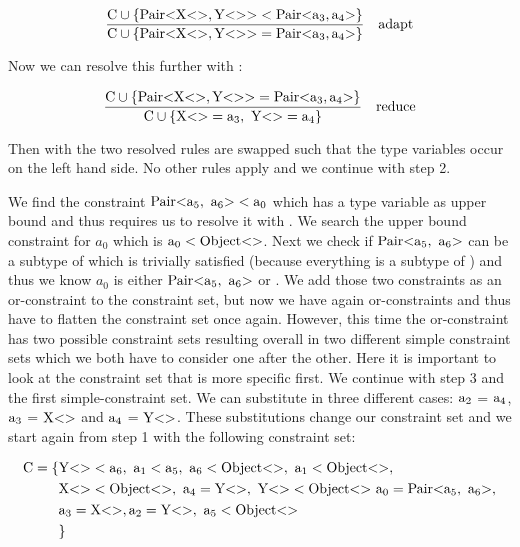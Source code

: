 \begin{align*}
    \frac{\text{C} \cup \{ \text{Pair} \text{<} \text{X} \text{<}  \text{>}, \text{Y} \text{<}  \text{>} \text{>} < \text{Pair} \text{<} \text{a}_{3}, \text{a}_{4} \text{>} \} }{\text{C} \cup \{ \text{Pair} \text{<} \text{X} \text{<}  \text{>}, \text{Y} \text{<}  \text{>} \text{>} = \text{Pair} \text{<} \text{a}_{3}, \text{a}_{4} \text{>} \} } \quad \text{adapt}
\end{align*}

Now we can resolve this further with :

\begin{align*}
    \frac{\cand \{ \nvtt{Pair}{\nvtt{X}{}, \nvtt{Y}{}} = \nvtt{Pair}{\fa{3}, \fa{4}} \} }{\cand \{ \nvtt{X}{} = \fa{3}, \ \nvtt{Y}{} = \fa{4} \} } \quad \text{reduce}
\end{align*}

Then with  the two resolved rules are swapped such that the type variables  occur on the left hand side.
No other rules apply and we continue with step 2.

We find the constraint $\text{Pair} \text{<} \text{a}_{5}, \ \text{a}_{6} \text{>} < \text{a}_{0}$ which has a type variable as upper bound and thus requires us to resolve it with . We search the upper bound constraint for $a_0$ which is $\text{a}_{0} < \text{Object} \text{<}  \text{>}$.
Next we check if $\nvtt{Pair}{\fa{5}, \ \fa{6}}$ can be a subtype of  which is trivially satisfied (because everything is a subtype of ) and thus we know $a_0$ is either $\nvtt{Pair}{\fa{5}, \ \fa{6}}$ or . We add those two constraints as an or-constraint
to the constraint set, but now we have again or-constraints and thus have to flatten the constraint set once again. However, this time the or-constraint has two possible constraint sets resulting overall in two different simple constraint sets which we both have to consider one after the other.
Here it is important to look at the constraint set that is more specific first. We continue with step 3 and the first simple-constraint set. We can substitute in three different cases: $\text{a}_{2}$ = $\text{a}_{4}$, $\text{a}_{3}$ = $\text{X} \text{<}  \text{>}$ and $\text{a}_{4}$ =  $\text{Y} \text{<}  \text{>}$.
These substitutions change our constraint set and we start again from step 1 with the following constraint set:

\begin{align*}
    \text{C} = \{& \nvtt{Y}{} < \fa{6}, \ \fa{1} < \fa{5}, \ \fa{6} < \nvtt{Object}{}, \ \fa{1} < \nvtt{Object}{}, \\
    &\nvtt{X}{} < \nvtt{Object}{}, \ \fa{4} = \nvtt{Y}{}, \ \nvtt{Y}{} < \nvtt{Object}{} \ \fa{0} = \nvtt{Pair}{\fa{5}, \ \fa{6}}, \\
    &\fa{3} = \nvtt{X}{}, \fa{2} = \nvtt{Y}{}, \ \fa{5} < \nvtt{Object}{} \\
    &\}
\end{align*}

